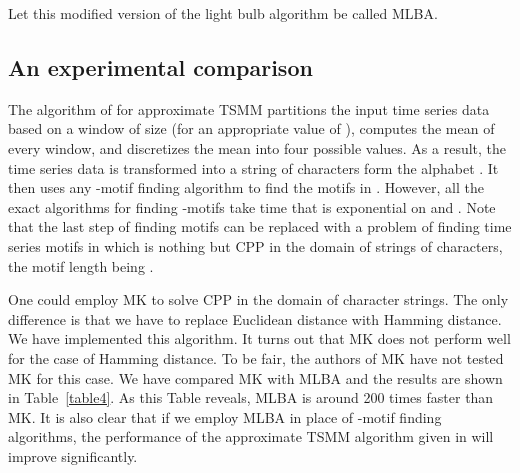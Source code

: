 \documentclass{article}
\theoremstyle{definition}
\theoremstyle{remark}
\begin{document}
Let this modified version of the light bulb algorithm be called MLBA.

\subsection{An experimental comparison}
The algorithm of \cite{BES03} for approximate TSMM partitions the input time series data  based on a window of size  (for an appropriate value of ), computes the mean of every window, and discretizes the mean into four possible values. As a result, the time series data is transformed into a string  of characters form the alphabet . It then uses any -motif finding algorithm to find the motifs in . However, all the exact algorithms for finding -motifs take time that is exponential on  and . Note that the last step of finding  motifs can be replaced with a problem of finding time series motifs in  which is nothing but CPP in the domain of strings of characters, the motif length being .

One could employ MK to solve CPP in the domain of character strings. The only difference is that we have to replace Euclidean distance with Hamming distance. We have implemented this algorithm. It turns out that MK does not perform well for the case of Hamming distance. To be fair, the authors of MK have not tested MK for this case. We have compared MK with MLBA and the results are shown in Table~\ref{table4}. As this Table reveals, MLBA is around 200 times faster than MK. It is also clear that if we employ MLBA in place of -motif finding algorithms, the performance of the approximate TSMM algorithm given in \cite{BES03} will improve significantly.
\end{document}
